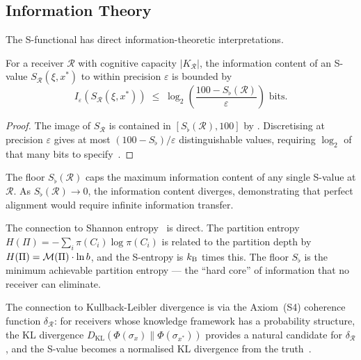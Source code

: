 \subsection{Information Theory}
\label{subsec:info-theory}

The S-functional has direct information-theoretic interpretations.

\begin{theorem}
\label{thm:info-content}
For a receiver $\mathcal{R}$ with cognitive capacity $|K_{\mathcal{R}}|$,
the information content of an S-value $S_{\mathcal{R}}(\xi, x^*)$ to
within precision $\varepsilon$ is bounded by
\[
  I_\varepsilon(S_{\mathcal{R}}(\xi, x^*))
  \;\leq\;
  \log_2\!\left( \frac{100 - S_\flat(\mathcal{R})}{\varepsilon} \right)
  \text{ bits.}
\]
\end{theorem}

\begin{proof}
The image of $S_{\mathcal{R}}$ is contained in $[S_\flat(\mathcal{R}), 100]$
by .  Discretising at precision $\varepsilon$ gives at
most $(100 - S_\flat) / \varepsilon$ distinguishable values, requiring
$\log_2$ of that many bits to specify~\citep{Shannon1948}.
\end{proof}

\begin{corollary}
\label{cor:floor-info-bound}
The floor $S_\flat(\mathcal{R})$ caps the maximum information content of
any single S-value at $\mathcal{R}$.  As $S_\flat(\mathcal{R}) \to 0$,
the information content diverges, demonstrating that perfect alignment
would require infinite information transfer.
\end{corollary}

The connection to Shannon entropy~\citep{Shannon1948} is direct.  The
partition entropy $H(\Pi) = -\sum_i \pi(C_i) \log \pi(C_i)$ is related to
the partition depth by $H(\Pi) = \mathcal{M}(\Pi) \cdot \ln b$, and the
S-entropy is $k_{\mathrm{B}}$ times this.  The floor $S_\flat$ is the minimum
achievable partition entropy — the ``hard core'' of information that no
receiver can eliminate.

The connection to Kullback-Leibler divergence is via the Axiom~(S4)
coherence function $\delta_{\mathcal{R}}$: for receivers whose knowledge
framework has a probability structure, the KL divergence
$D_{\mathrm{KL}}(\Phi(\sigma_x) \| \Phi(\sigma_{x^*}))$ provides a natural
candidate for $\delta_{\mathcal{R}}$, and the S-value becomes a normalised
KL divergence from the truth~\citep{Jaynes1957}.

